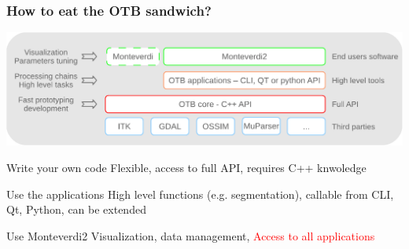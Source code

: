 \documentclass[8pt]{beamer}
\begin{document}
\begin{frame}
\frametitle{How to eat the OTB sandwich?}
\vspace{-0.5cm}
\begin{center}
\includegraphics[width=\textwidth]{images/sandwich.pdf}
\end{center}
\vspace{-0.5cm}
\begin{block}{Write your own code}
 Flexible, access to full API, requires C++ knwoledge
\end{block}
\begin{block}{Use the applications}
 High level functions (e.g. segmentation), callable from CLI, Qt, Python, can be extended
\end{block}
\begin{block}{Use Monteverdi2}
Visualization, data management, \textcolor{red}{Access to all applications}
\end{block}
\end{frame}
\end{document}
